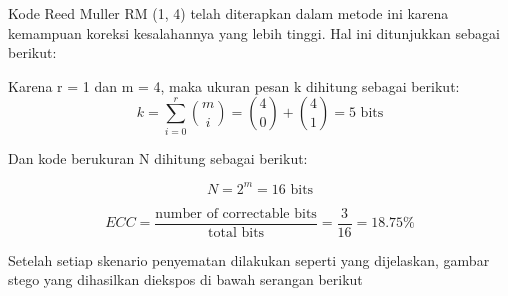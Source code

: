 \documentclass{ittelkom}
\begin{document}
Kode Reed Muller RM (1, 4) telah diterapkan dalam metode ini karena kemampuan
koreksi kesalahannya yang lebih tinggi. Hal ini ditunjukkan sebagai berikut:

Karena r = 1 dan m = 4, maka ukuran pesan k dihitung sebagai berikut:
\begin{equation}
    k = \sum_{i=0}^{r} \binom{m}{i} = \binom{4}{0} + \binom{4}{1} = 5 \text{ bits}
    \label{eq:rm}
\end{equation}

Dan kode berukuran N dihitung sebagai berikut:

\begin{equation}
    N = 2^m = 16 \text{ bits}
    \label{eq:rm2}
\end{equation}

\begin{equation}
    ECC = \frac{\text{number of correctable bits}}{\text{total bits}} = \frac{3}{16} = 18.75\%
\end{equation}

Setelah setiap skenario penyematan dilakukan seperti yang dijelaskan, gambar
stego yang dihasilkan diekspos di bawah serangan berikut
\end{document}
